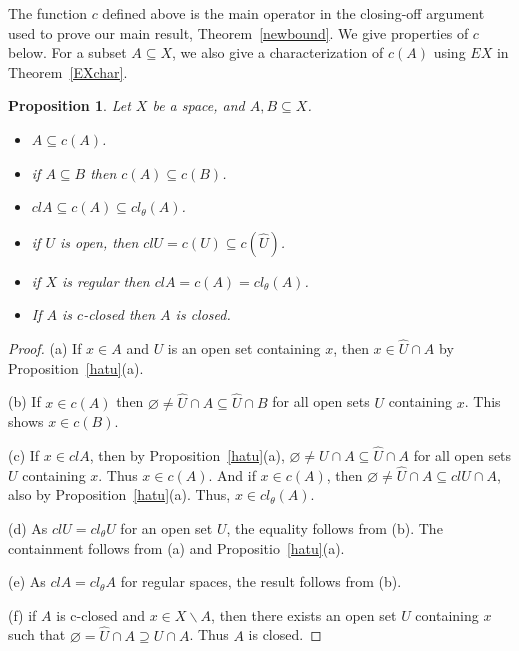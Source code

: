 \documentclass[11pt]{amsart}
\newif\ifdraft\draftfalse
\newtheorem{proposition}[theorem]{Proposition}
\theoremstyle{definition}
\theoremstyle{remark}
\numberwithin{equation}{section}
\begin{document}
The function $c$ defined above is the main operator in the closing-off argument used to prove our main result, Theorem~\ref{newbound}. We give properties of $c$ below.  For a subset $A{\subseteq} X$, we also give a characterization of $c(A)$ using $EX$ in Theorem~\ref{EXchar}.

\begin{proposition}{{\immediate{}}{\ifdraft\hspace{-\lastskip}\vadjust{\vspace{-1mm}\smash{\llap{{\tt {{properties}}}\hspace{8mm}}}\vspace{1mm}}\fi}}
Let $X$ be a space, and $A, B{\subseteq} X$.
\begin{itemize}
\item[(a)] $A{\subseteq} c(A)$.
\item[(b)] if $A{\subseteq} B$ then $c(A){\subseteq} c(B)$.
\item[(c)] $clA{\subseteq} c(A){\subseteq} cl_\theta(A)$.
\item[(d)] if $U$ is open, then $clU=c(U){\subseteq} c(\widehat{U})$. 
\item[(e)] if $X$ is regular then $clA=c(A)=cl_\theta(A)$.
\item[(f)] If $A$ is $c$-closed then $A$ is closed.
\end{itemize}
\end{proposition}
\begin{proof}
(a) If $x\in A$ and $U$ is an open set containing $x$, then $x\in\widehat{U}{\cap} A$ by Proposition~\ref{hatu}(a).

(b) If $x\in c(A)$ then ${\varnothing}\neq \widehat{U}{\cap} A{\subseteq}\widehat{U}{\cap} B$ for all open sets $U$ containing $x$. This shows $x\in c(B)$.

(c) If $x\in clA$, then by Proposition~\ref{hatu}(a), ${\varnothing}\neq U{\cap} A{\subseteq}\widehat{U}{\cap} A$ for all open sets $U$ containing $x$. Thus $x\in c(A)$. And if $x\in c(A)$, then ${\varnothing}\neq\widehat{U}{\cap} A{\subseteq} clU{\cap} A$, also by Proposition~\ref{hatu}(a). Thus, $x\in cl_\theta(A)$.

(d) As $clU=cl_\theta U$ for an open set $U$, the equality follows from (b). The containment follows from (a) and Propositio~\ref{hatu}(a).

(e) As $clA=cl_\theta A$ for regular spaces, the result follows from (b).

(f) if $A$ is c-closed and $x\in X{\backslash} A$, then there exists an open set $U$ containing $x$ such that ${\varnothing}= \widehat{U}{\cap} A\supseteq U{\cap} A$. Thus $A$ is closed.
\end{proof}
\end{document}
